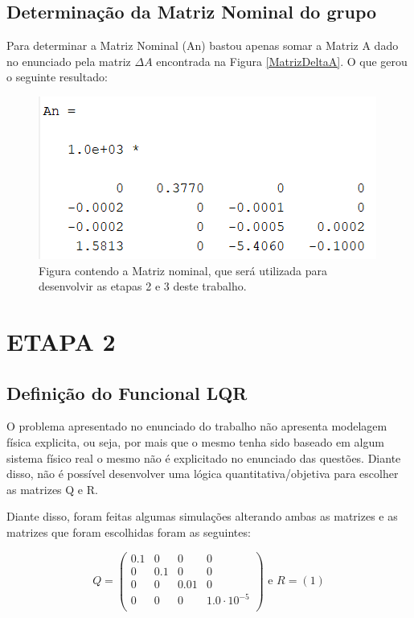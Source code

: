 \documentclass[a4paper,12pt]{article}
\begin{document}
\subsection{Determinação da Matriz Nominal do grupo}

Para determinar a Matriz Nominal (An) bastou apenas somar a Matriz A dado no enunciado pela matriz $\Delta A$ encontrada na Figura \ref{MatrizDeltaA}. O que gerou o seguinte resultado:

\begin{figure}[!h]
  \hspace*{-1cm} 
  \includegraphics[width=8 cm]{MatrizNominal.png}
  \centering
  \caption{Figura contendo a Matriz nominal, que será utilizada para desenvolvir as etapas 2 e 3 deste trabalho.}
  \label{MatrizNominal}
\end{figure}
\clearpage
\newpage

\section{ETAPA 2}
\subsection{Definição do Funcional LQR}

O problema apresentado no enunciado do trabalho não apresenta modelagem física explicita, ou seja, por mais que o mesmo tenha sido baseado em algum sistema físico real o mesmo não é explicitado no enunciado das questões. Diante disso, não é possível desenvolver uma lógica quantitativa/objetiva para escolher as matrizes Q e R. 

Diante disso, foram feitas algumas simulações alterando ambas as matrizes e as matrizes que foram escolhidas foram as seguintes:

$$
Q = \left(
\begin{array}{cccc}
0.1 &	0	& 0	& 0 \\
0&	0.1&	0&	0 \\
0&	0&	0.01&	0 \\
0&	0&	0&	1.0\cdot 10^{-5}  \\
\end{array}\right)
\text{ e } R=(1)
$$
\end{document}
